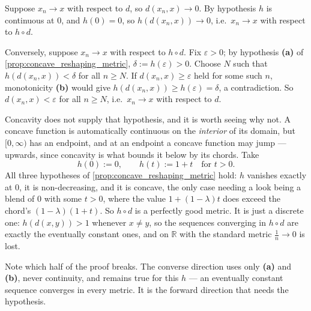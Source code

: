 \begin{exercisesolution}
\label{sol:reshaping_same_convergence}
Suppose $x_n \to x$ with respect to $d$, so $d(x_n,x) \to 0$. By hypothesis $h$ is continuous at
$0$, and $h(0)=0$, so $h(d(x_n,x)) \to 0$, i.e.\ $x_n \to x$ with respect to $h \circ d$.

Conversely, suppose $x_n \to x$ with respect to $h \circ d$. Fix $\varepsilon > 0$; by hypothesis
\textbf{(a)} of \cref{prop:concave_reshaping_metric}, $\delta := h(\varepsilon) > 0$. Choose $N$
such that $h(d(x_n,x)) < \delta$ for all $n \geq N$. If $d(x_n,x) \geq \varepsilon$ held for some
such $n$, monotonicity \textbf{(b)} would give $h(d(x_n,x)) \geq h(\varepsilon) = \delta$, a
contradiction. So $d(x_n,x) < \varepsilon$ for all $n \geq N$, i.e.\ $x_n \to x$ with respect to
$d$.

\begin{remark}
Concavity does not supply that hypothesis, and it is worth seeing why not. A concave function is
automatically continuous on the \emph{interior} of its domain, but $[0,\infty)$ has an endpoint,
and at an endpoint a concave function may jump --- upwards, since concavity is what bounds it
below by its chords. Take
\[h(0) := 0, \qquad h(t) := 1+t \quad \text{for } t>0.\]
All three hypotheses of \cref{prop:concave_reshaping_metric} hold: $h$ vanishes exactly at $0$,
it is non-decreasing, and it is concave, the only case needing a look being a blend of $0$ with
some $t>0$, where the value $1+(1-\lambda)t$ does exceed the chord's $(1-\lambda)(1+t)$. So
$h \circ d$ is a perfectly good metric. It is just a discrete one: $h(d(x,y)) > 1$ whenever
$x \neq y$, so the sequences converging in $h \circ d$ are exactly the eventually constant ones,
and on $\mathbb{R}$ with the standard metric $\tfrac1n \to 0$ is lost.

Note which half of the proof breaks. The converse direction uses only \textbf{(a)} and
\textbf{(b)}, never continuity, and remains true for this $h$ --- an eventually constant sequence
converges in every metric. It is the forward direction that needs the hypothesis.
\end{remark}
\end{exercisesolution}

